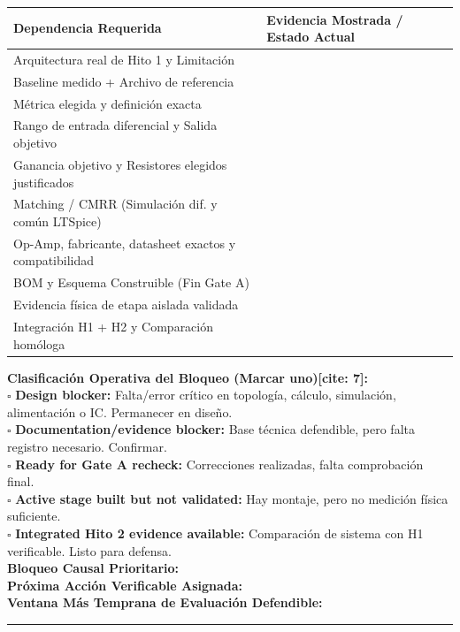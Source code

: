 \documentclass[10pt, a4paper]{article}
\begin{document}
\begin{table}[htbp]
    \centering
    \footnotesize
    \renewcommand{\arraystretch}{1.45}
    \begin{tabularx}{\textwidth}{|P{6.5cm}|Y|}
    \hline
    \textbf{Dependencia Requerida} & \textbf{Evidencia Mostrada / Estado Actual} \\ \hline
    Arquitectura real de Hito 1 y Limitación & \\ \hline
    Baseline medido + Archivo de referencia & \\ \hline
    Métrica elegida y definición exacta & \\ \hline
    Rango de entrada diferencial y Salida objetivo & \\ \hline
    Ganancia objetivo y Resistores elegidos justificados & \\ \hline
    Matching / CMRR (Simulación dif. y común LTSpice) & \\ \hline
    Op-Amp, fabricante, datasheet exactos y compatibilidad & \\ \hline
    BOM y Esquema Construible (Fin Gate A) & \\ \hline
    Evidencia física de etapa aislada validada & \\ \hline
    Integración H1 + H2 y Comparación homóloga & \\ \hline
    \end{tabularx}
\end{table}

\begin{tcolorbox}[colback=red!5, colframe=red!70!black]
    \textbf{Clasificación Operativa del Bloqueo (Marcar uno)[cite: 7]:} \\[0.15cm]
    $\square$ \textbf{Design blocker:} Falta/error crítico en topología, cálculo, simulación, alimentación o IC. Permanecer en diseño.\\[0.1cm]
    $\square$ \textbf{Documentation/evidence blocker:} Base técnica defendible, pero falta registro necesario. Confirmar.\\[0.1cm]
    $\square$ \textbf{Ready for Gate A recheck:} Correcciones realizadas, falta comprobación final.\\[0.1cm]
    $\square$ \textbf{Active stage built but not validated:} Hay montaje, pero no medición física suficiente.\\[0.1cm]
    $\square$ \textbf{Integrated Hito 2 evidence available:} Comparación de sistema con H1 verificable. Listo para defensa. \\[0.2cm]
    \textbf{Bloqueo Causal Prioritario:} \hrulefill \\[0.15cm]
    \textbf{Próxima Acción Verificable Asignada:} \hrulefill \\[0.15cm]
    \textbf{Ventana Más Temprana de Evaluación Defendible:} \rule{4.5cm}{0.4pt}
\end{tcolorbox}
\end{document}
